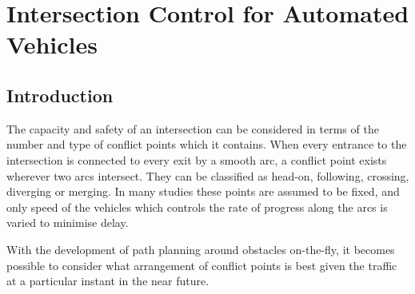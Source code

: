 
\chapter{Intersection Control for Automated Vehicles }
\section{Introduction}
The capacity and safety of an intersection can be considered in terms of the number and type of conflict points which it contains. When every entrance to the intersection is connected to every exit by a smooth arc, a conflict point exists wherever two arcs intersect. They can be classified as head-on, following, crossing, diverging or merging. In many studies these points are assumed to be fixed, and only speed of the vehicles which controls the rate of progress along the arcs is varied to minimise delay. 

With the development of path planning around obstacles on-the-fly, it becomes possible to consider what arrangement of conflict points is best given the traffic at a particular instant in the near future. 


